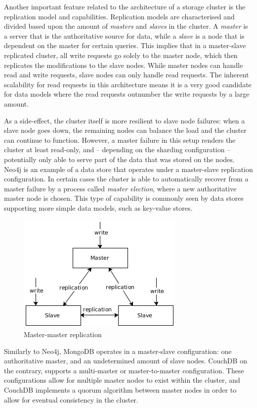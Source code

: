 Another important feature related to the architecture of a storage cluster is the replication model and capabilities.
Replication models are characterised and divided based upon the amount of \textit{masters} and \textit{slaves} in the cluster.
A \textit{master} is a server that is the authoritative source for data, while a \textit{slave} is a node that is dependent on the master for certain queries.
This implies that in a master-slave replicated cluster, all write requests go solely to the master node, which then replicates the modifications to the slave nodes.
While master nodes can handle read and write requests, slave nodes can only handle read requests.
The inherent scalability for read requests in this architecture means it is a very good candidate for data models where the read requests outnumber the write requests by a large amount.

As a side-effect, the cluster itself is more resilient to slave node failures: when a slave node goes down, the remaining nodes can balance the load and the cluster can continue to function.
However, a master failure in this setup renders the cluster at least read-only, and -- depending on the sharding configuration -- potentially only able to serve part of the data that was stored on the nodes.
Neo4j is an example of a data store that operates under a master-slave replication configuration.
In certain cases the cluster is able to automatically recover from a master failure by a process called \textit{master election}, where a new authoritative master node is chosen.
This type of capability is commonly seen by data stores supporting more simple data models, such as key-value stores.

\begin{figure}
  \centering
  \includegraphics[width=.4\textwidth]{img/replication-master-master.png}
  \caption{Master-master replication}
  \label{fig:replication-master-master}
\end{figure}

Similarly to Neo4j, MongoDB operates in a master-slave configuration: one authoritative master, and an undetermined amount of slave nodes.
CouchDB on the contrary, supports a multi-master or master-to-master configuration.
These configurations allow for multiple master nodes to exist within the cluster, and CouchDB implements a quorum algorithm between master nodes in order to allow for eventual consistency in the cluster.

